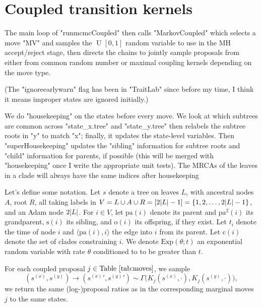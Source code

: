 \documentclass[11pt,a4paper]{article}
\newcommand{\edge}[2]{\langle#1, #2\rangle}
\newcommand{\pa}{\mathrm{pa}}
\newcommand{\sib}{\mathrm{s}}
\newcommand{\off}{\mathrm{o}}
\newcommand{\cla}{\mathrm{c}}
\newcommand{\Exp}[1]{\mathrm{Exp}(#1)}
\DeclarePairedDelimiter\abs{\lvert}{\rvert}%
\DeclareMathOperator*{\Unif}{\mathrm{U}}
\begin{document}
\section{Coupled transition kernels}

The main loop of "runmcmcCoupled" then calls "MarkovCoupled" which selects a move "MV" and samples the $ \Unif[0, 1] $ random variable to use in the MH accept/reject stage, then directs the chains to jointly sample proposals from either from common random number or maximal coupling kernels depending on the move type.



(The "ignoreearlywarn" flag has been in "TraitLab" since before my time, I think it means improper states are ignored initially.)

We do "housekeeping" on the states before every move. We look at which subtrees are common across "state_x.tree" and "state_y.tree" then relabels the subtree roots in "y" to match "x"; finally, it updates the state-level variables. Then "superHousekeeping" updates the "sibling" information for subtree roots and "child" information for parents, if possible (this will be merged with "housekeeping" once I write the appropriate unit tests). The MRCAs of the leaves in a clade will always have the same indices after housekeeping



Let's define some notation. Let $ s $ denote a tree on leaves $ L $, with ancestral nodes $ A $, root $ R $, all taking labels in $ V = L \cup A \cup R = [2 \abs{L} - 1] = \{1, 2, \dotsc, 2 \abs{L} - 1\} $, and an Adam node $ 2 \abs{L} $. For $ i \in V $, let $ \pa(i) $ denote its parent and $ \pa^2(i) $ its grandparent, $ \sib(i) $ its sibling, and $ \off(i) $ its offspring, if they exist. Let $ t_i $ denote the time of node $ i $ and $ \edge{\pa(i)}{i} $ the edge into $ i $ from its parent. Let $ \cla(i) $ denote the set of clades constraining $ i $. We denote $ \Exp{\theta; t} $ an exponential random variable with rate $ \theta $ conditioned to to be greater than $ t $.

For each coupled proposal $ j \in \text{Table~\ref{tab:moves}} $, we sample
\[
(s^{(x)}, s^{(y)}) \rightarrow (s^{(x)}{'}, s^{(y)}{'}) \sim \Gamma\big(K_j(s^{(x)}, \cdot), K_j(s^{(y)}, \cdot)\big),
\]
we return the same (log-)proposal ratios as in the corresponding marginal moves $ j $ to the same states.
\end{document}
